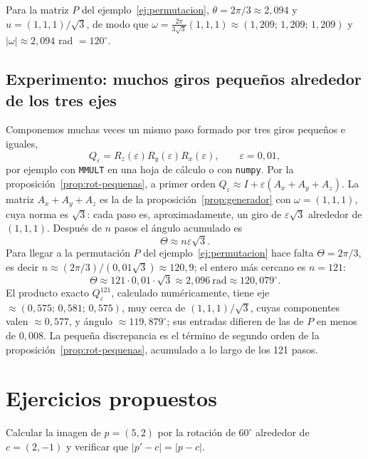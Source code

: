 \begin{ejemplo}
Para la matriz \(P\) del ejemplo~\ref{ej:permutacion}, \(\theta=2\pi/3\approx2{,}094\) y
\(u=(1,1,1)/\sqrt3\), de modo que
\(\omega=\tfrac{2\pi}{3\sqrt3}(1,1,1)\approx(1{,}209;\,1{,}209;\,1{,}209)\) y
\(|\omega|\approx2{,}094\) rad \(=120^\circ\).
\end{ejemplo}

\subsection{Experimento: muchos giros pequeños alrededor de los tres ejes}

Componemos muchas veces un mismo paso formado por tres giros pequeños e iguales,
\[
Q_\varepsilon
=R_z(\varepsilon)R_y(\varepsilon)R_x(\varepsilon),
\qquad \varepsilon=0{,}01,
\]
por ejemplo con \texttt{MMULT} en una hoja de cálculo o con \texttt{numpy}. Por la
proposición~\ref{prop:rot-pequenas}, a primer orden
\(Q_\varepsilon\approx I+\varepsilon(A_x+A_y+A_z)\). La matriz \(A_x+A_y+A_z\) es la de la
proposición~\ref{prop:generador} con \(\omega=(1,1,1)\), cuya norma es \(\sqrt3\): cada paso
es, aproximadamente, un giro de \(\varepsilon\sqrt3\) alrededor de \((1,1,1)\). Después de
\(n\) pasos el ángulo acumulado es
\[
  \Theta\approx n\varepsilon\sqrt3.
\]
Para llegar a la permutación \(P\) del ejemplo~\ref{ej:permutacion} hace falta
\(\Theta=2\pi/3\), es decir \(n\approx(2\pi/3)/(0{,}01\sqrt3)\approx120{,}9\); el entero más
cercano es \(n=121\):
\[
  \Theta\approx121\cdot0{,}01\cdot\sqrt3
  \approx2{,}096\ \text{rad}
  \approx120{,}079^\circ.
\]
El producto exacto \(Q_\varepsilon^{121}\), calculado numéricamente, tiene eje
\(\approx(0{,}575;\,0{,}581;\,0{,}575)\), muy cerca de \((1,1,1)/\sqrt3\), cuyas
componentes valen \(\approx0{,}577\), y ángulo \(\approx119{,}879^\circ\); sus entradas difieren de las de \(P\) en
menos de \(0{,}008\). La pequeña discrepancia es el término de segundo orden de la
proposición~\ref{prop:rot-pequenas}, acumulado a lo largo de los 121 pasos.

\section{Ejercicios propuestos}

\begin{ejercicio}
Calcular la imagen de \(p=(5,2)\) por la rotación de \(60^\circ\) alrededor de \(c=(2,-1)\) y
verificar que \(|p'-c|=|p-c|\).
\end{ejercicio}


